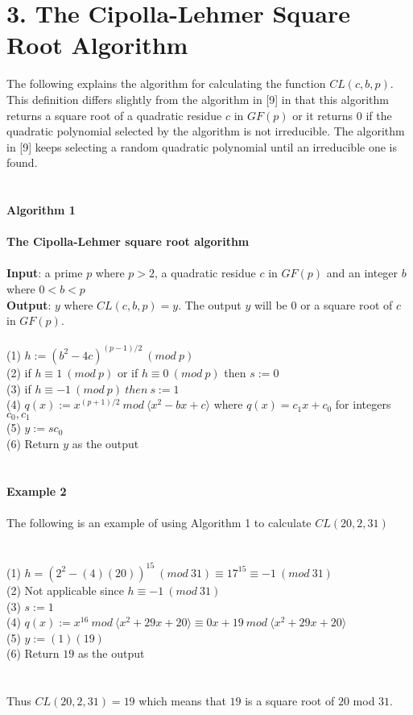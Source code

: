 \documentclass[final,letterpaper,oneside,10pt]{article}
\begin{document}
\section*{3. The Cipolla-Lehmer Square Root Algorithm}

The following explains the algorithm for calculating the function $CL(c,b,p)$.  This definition differs slightly from the algorithm in [9] in that this algorithm
returns a square root of a quadratic residue $c$ in $GF(p)$ or it returns $0$ if the quadratic polynomial selected by the algorithm is not irreducible.
The algorithm in [9] keeps selecting a random quadratic polynomial until an irreducible one is found.
\\
\\
\\
\textbf{Algorithm 1}
\\
\\
\textbf{The Cipolla-Lehmer square root algorithm}
\\
\\
\textbf{Input}: a prime $p$ where $p>2$, a quadratic residue $c$ in $GF(p)$
and an integer $b$ where $0<b<p$
\\
\textbf{Output}: $y$ where $CL(c,b,p) = y$. The output $y$ will be $0$ or a square root of $c$ in $GF(p)$.
\\
\\
(1) $h := (b^2-4c)^{(p-1)/2}~(mod~p)$
\\
(2) if $h \equiv 1~(mod~p)$ or if $h \equiv 0~(mod~p)$ then $s:=0$
\\
(3) if $h \equiv -1~(mod~p)~ then~ s:=1$
\\
(4) $q(x) := x^{(p+1)/2}~ mod~ \langle x^2- bx + c \rangle$ where 
$q(x) = c_1 x + c_0$ for integers $c_0, c_1$
\\
(5) $y:=sc_0$
\\
(6) Return $y$ as the output
\\
\\
\\
\textbf{Example 2}
\\
\\
The following is an example of using Algorithm 1 to calculate $CL(20,2,31)$
\\
\\
\\
(1) $h=(2^2 - (4)(20))^{15}~(mod~31) \equiv 17^{15} \equiv -1~(mod~31)$
\\
(2) Not applicable since $h \equiv -1~(mod~31)$
\\
(3) $s:=1$
\\
(4) $q(x):=x^{16} ~mod~\langle x^2 + 29x+20 \rangle \equiv 0x+19 ~mod~\langle x^2 + 29x+20 \rangle$
\\
(5) $y:=(1)(19)$
\\
(6) Return $19$ as the output
\\
\\
\\
Thus $CL(20,2,31) = 19$ which means that $19$ is a square root of $20$ mod $31$.
\\
\\
\end{document}
